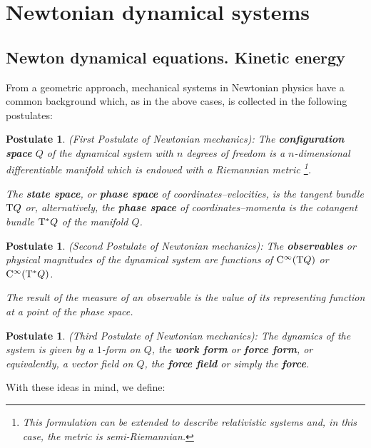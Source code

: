 \documentclass[12pt]{report}
\newtheorem{pos}[teor]{Postulate}
\def\Tan{{\rm T}}
\def\Cinfty{{\rm C}^\infty}
\begin{document}


\section{Newtonian dynamical systems}


\subsection{Newton dynamical equations. Kinetic energy}


From a geometric approach, mechanical systems in Newtonian physics have a common background which, as in the above cases,
 is collected in the following postulates:

\begin{pos}
{\rm (First Postulate of  Newtonian mechanics\/)}:
The \textbf{configuration space} $Q$ of the dynamical system
with $n$ degrees of freedom is a $n$-dimensional differentiable manifold which is endowed with a \textsl{Riemannian metric}
\footnote{
This formulation can be extended to describe relativistic systems
and, in this case, the metric is semi-Riemannian.}. 

The \textbf{state space}, or \textbf{phase space} of coordinates--velocities, is the tangent bundle $\Tan Q$ or, alternatively, the \textbf{phase space} of coordinates--momenta
is the cotangent bundle $\Tan^*Q$ of the manifold $Q$.
\end{pos}

\begin{pos}
{\rm (Second Postulate of  Newtonian mechanics\/)}:
The \textbf{observables} or physical magnitudes of the dynamical system
are functions of $\Cinfty (\Tan Q)$ or $\Cinfty (\Tan^*Q)$.

The result of the measure of an observable
is the value of its representing function at a point of the phase space.
\end{pos}

\begin{pos}
{\rm (Third Postulate of Newtonian mechanics\/)}:
The dynamics of the system is given by a $1$-form on $Q$,
the  \textbf{work form} or \textbf{force form}, or equivalently, a vector field on $Q$, 
the \textbf{force field} or simply the \textbf{force}. 
\end{pos}

With these ideas in mind, we define:
\end{document}
